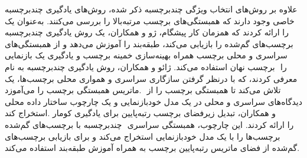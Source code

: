 	علاوه بر روش‌های انتخاب ویژگی چندبرچسبه ذکر شده، روش‌های یادگیری چندبرچسبه خاصی وجود دارند که همبستگی‌های برچسب مرتبه‌بالا را بررسی می‌کنند. به‌عنوان یک کار پیشگام، ژو و همکاران\cite{zhu2017multi}، یک روش یادگیری چندبرچسبه‎‎ را ارائه کردند که همزمان برچسب‌های گم‌شده را بازیابی می‌کند،	طبقه‌بند را آموزش می‌دهد و از همبستگی‌های سراسری و محلی برچسب همراه بهینه‌سازی خمینه‌ برچسب و یادگیری یک بازنمایی‌ برچسب نهان استفاده می‌کند. ژائو و همکاران\cite{zhao2022learning}، روش یادگیری چندبرچسبه به نام ‎‎ را معرفی کردند، که با در‌نظر گرفتن سازگاری سراسری و همواری محلی برچسب‌ها، یک ماتریس همبستگی برچسب را می‌آموزد. ‎ تلاش می‌کند تا همبستگی برچسب را از دیدگاه‌های سراسری و محلی در یک مدل خودبازنمایی و یک چارچوب ساختار داده محلی استخراج کند. ‎کومار‎ و همکاران\cite{kumar2022low}، تبدیل زیرفضای برچسب رتبه‌پایین برای یادگیری چند‌برچسبه با برچسب‌های گم‌شده ‎‎ را ارائه کردند. این چارچوب، همبستگی سراسری برچسب‌ها را با یک مدل خود‌بازنمایی استخراج می‌کند و برای بازیابی برچسب‌های گم‌شده از فضای ماتریس رتبه‌پایین برچسب به همراه آموزش طبقه‌بند استفاده می‌کند.